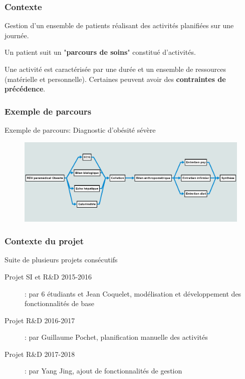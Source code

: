 \documentclass{beamer}
\begin{document}
\begin{frame}
\frametitle{Contexte}

Gestion d'un ensemble de patients réalisant des activités planifiées sur une journée.

\bigbreak

Un patient suit un "\textbf{parcours de soins}" constitué d'activités.

\bigbreak

Une activité est caractérisée par une durée et un ensemble de ressources (matérielle et personnelle). Certaines peuvent avoir des \textbf{contraintes de précédence}. 

\end{frame}

\begin{frame}
\frametitle{Exemple de parcours}
	
Exemple de parcours: Diagnostic d'obésité sévère
	
\begin{figure}
	\includegraphics[scale=0.425]{images/exemple_parcours}
\end{figure}
	
\end{frame}


\begin{frame}
\frametitle{Contexte du projet}

\begin{block}{Suite de plusieurs projets consécutifs}
	\begin{description}
		\item[Projet SI et R\&D 2015-2016]: par 6 étudiants et Jean Coquelet, modélisation et développement des fonctionnalités de base
		\item[Projet R\&D 2016-2017]: par Guillaume Pochet, planification manuelle des activités
		\item[Projet R\&D 2017-2018]: par Yang Jing, ajout de fonctionnalités de gestion
	\end{description}
\end{block}

\end{frame}
\end{document}
